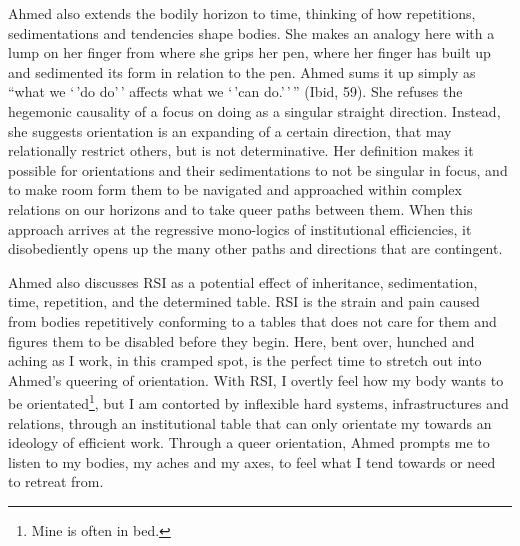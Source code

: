 Ahmed also extends the bodily horizon to time, thinking of how
repetitions, sedimentations and tendencies shape bodies. She makes an
analogy here with a lump on her finger from where she grips her pen,
where her finger has built up and sedimented its form in relation to the
pen. Ahmed sums it up simply as ``what we `\,'do do'\,' affects what we
`\,'can do.'\,'\,'' (Ibid, 59). She refuses the hegemonic causality of a
focus on doing as a singular straight direction. Instead, she suggests
orientation is an expanding of a certain direction, that may
relationally restrict others, but is not determinative. Her definition
makes it possible for orientations and their sedimentations to not be
singular in focus, and to make room form them to be navigated and
approached within complex relations on our horizons and to take queer
paths between them. When this approach arrives at the regressive
mono-logics of institutional efficiencies, it disobediently opens up the
many other paths and directions that are contingent.

Ahmed also discusses RSI as a potential effect of inheritance,
sedimentation, time, repetition, and the determined table. RSI is the
strain and pain caused from bodies repetitively conforming to a tables
that does not care for them and figures them to be disabled before they
begin. Here, bent over, hunched and aching as I work, in this cramped
spot, is the perfect time to stretch out into Ahmed's queering of
orientation. With RSI, I overtly feel how my body wants to be
orientated\footnote{Mine is often in bed.}, but I am contorted by
inflexible hard systems, infrastructures and relations, through an
institutional table that can only orientate my towards an ideology of
efficient work. Through a queer orientation, Ahmed prompts me to listen
to my bodies, my aches and my axes, to feel what I tend towards or need
to retreat from.

